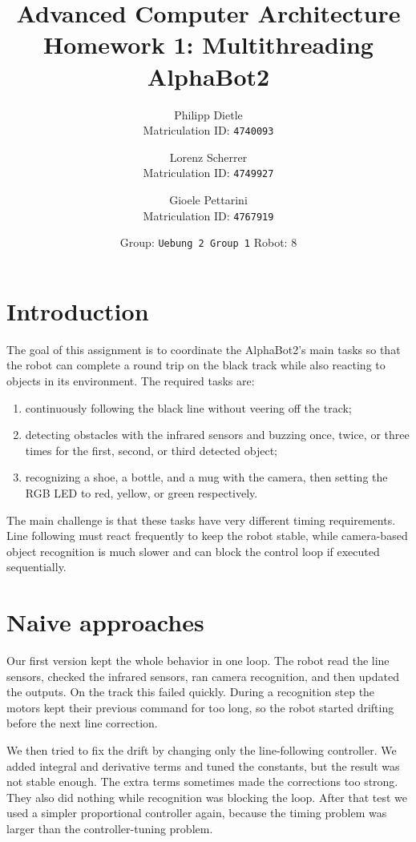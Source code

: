 \documentclass{article}
\title{Advanced Computer Architecture\\Homework 1: Multithreading AlphaBot2}
\author{
    Philipp Dietle\\
    Matriculation ID: \texttt{4740093}
    \and
    Lorenz Scherrer\\
    Matriculation ID: \texttt{4749927}
    \and
    Gioele Pettarini\\
    Matriculation ID: \texttt{4767919}
}
\date{
    Group: \texttt{Uebung 2 Group 1}
    \quad
    Robot: 8
}
\begin{document}
\maketitle

\section{Introduction}

The goal of this assignment is to coordinate the AlphaBot2's main tasks so that the robot can complete a round trip on the black track while also reacting to objects in its environment. The required tasks are:
\begin{enumerate}
    \item continuously following the black line without veering off the track;
    \item detecting obstacles with the infrared sensors and buzzing once, twice, or three times for the first, second, or third detected object;
    \item recognizing a shoe, a bottle, and a mug with the camera, then setting the RGB LED to red, yellow, or green respectively.
\end{enumerate}

The main challenge is that these tasks have very different timing requirements. Line following must react frequently to keep the robot stable, while camera-based object recognition is much slower and can block the control loop if executed sequentially.

\section{Naive approaches}

Our first version kept the whole behavior in one loop. The robot read the line sensors, checked the infrared sensors, ran camera recognition, and then updated the outputs. On the track this failed quickly. During a recognition step the motors kept their previous command for too long, so the robot started drifting before the next line correction.

We then tried to fix the drift by changing only the line-following controller. We added integral and derivative terms and tuned the constants, but the result was not stable enough. The extra terms sometimes made the corrections too strong. They also did nothing while recognition was blocking the loop. After that test we used a simpler proportional controller again, because the timing problem was larger than the controller-tuning problem.
\end{document}
